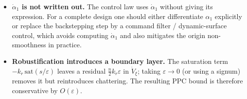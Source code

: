 \begin{itemize}
    \item \textbf{$\dot\alpha_1$ is not written out.}
    The control law uses $\dot\alpha_1$ without giving its expression. For a
    complete design one should either differentiate $\alpha_1$ explicitly or
    replace the backstepping step by a command filter / dynamic-surface
    control, which avoids computing $\dot\alpha_1$ and also mitigates the
    origin non-smoothness in practice.

    \item \textbf{Robustification introduces a boundary layer.}
    The saturation term $-k_r\,\mathrm{sat}(s/\varepsilon)$ leaves a residual
    $\tfrac n2k_r\varepsilon$ in $\dot V_\xi$; taking $\varepsilon\to0$ (or
    using a signum) removes it but reintroduces chattering. The resulting PPC
    bound is therefore conservative by $O(\varepsilon)$.
\end{itemize}
